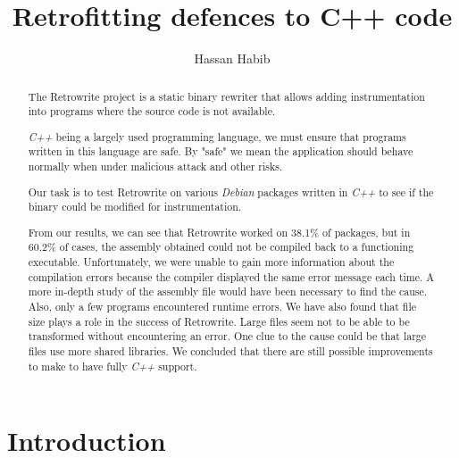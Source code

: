 \documentclass[a4paper,11pt,oneside]{report}
\title{Retrofitting defences to C++ code}
\author{Hassan Habib}
\newcommand{\sysname}{Retrowrite\xspace}
\begin{document}
\maketitle

\begin{abstract}
    The \sysname project is a static binary rewriter that allows adding
    instrumentation into programs where the source code is not available.

    \textit{C++} being a largely used programming language, we must ensure that programs
    written in this language are safe. By "safe" we mean the application should
    behave normally when under malicious attack and other risks.

    Our task is to test Retrowrite on various \textit{Debian} packages written in \textit{C++} to
    see if the binary could be modified for instrumentation.

    From our results, we can see that \sysname worked on 38.1\% of packages,
    but in 60.2\% of cases, the assembly obtained could not be compiled back to
    a functioning executable. Unfortunately, we were unable to gain more
    information about the compilation errors because the compiler displayed the
    same error message each time. A more in-depth study of the assembly file
    would have been necessary to find the cause. Also, only a few programs
    encountered runtime errors. We have also found that file size plays a role
    in the success of \sysname. Large files seem not to be able to be
    transformed without encountering an error. One clue to the cause could be
    that large files use more shared libraries. We concluded that there are
    still possible improvements to make to have fully \textit{C++} support.

\end{abstract}


\maketoc

\chapter{Introduction}
\end{document}
